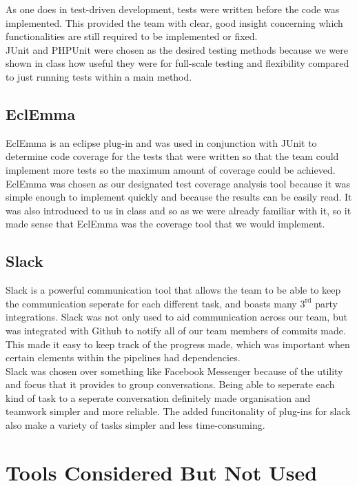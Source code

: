\documentclass[12pt]{report}
\begin{document}
As one does in test-driven development, tests were written before the code was implemented. This
provided the team with clear, good insight concerning which functionalities are still required to be
implemented or fixed.\\

JUnit and PHPUnit were chosen as the desired testing methods because we were shown in class how
useful they were for full-scale testing and flexibility compared to just running tests within a main
method. 

\subsection{EclEmma}
EclEmma is an eclipse plug-in and was used in conjunction with JUnit to determine code coverage for the tests that were written so that the team could implement more tests so the maximum amount of coverage could be achieved. \\

EclEmma was chosen as our designated test coverage analysis tool because it was simple enough to
implement quickly and because the results can be easily read. It was also introduced to us in class
and so as we were already familiar with it, so it made sense that EclEmma was the coverage tool that we
would implement.

\subsection{Slack}
Slack is a powerful communication tool that allows the team to be able to keep the communication seperate
for each different task, and boasts many $3^{\text{rd}}$ party integrations. Slack was not only used
to aid communication across our team, but was integrated with Github to notify all of our team
members of commits made. This made it easy to keep track of the progress made, which was important
when certain elements within the pipelines had dependencies.\\

Slack was chosen over something like Facebook Messenger because of the utility and focus that it
provides to group conversations. Being able to seperate each kind of task to a seperate conversation
definitely made organisation and teamwork simpler and more reliable. The added funcitonality of
plug-ins for slack also make a variety of tasks simpler and less time-consuming.

\section{Tools Considered But Not Used}
\end{document}
